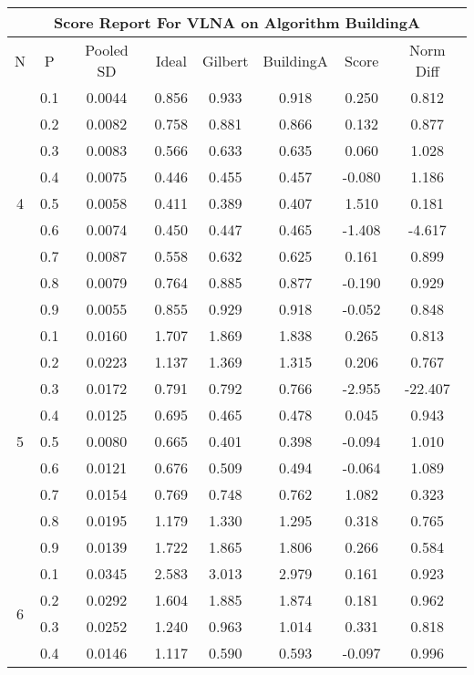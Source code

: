 \documentclass[11pt,a4paper]{report}
\begin{document}
\begin{longtable}{ | c | c || c | c | c | c | c | c | }
\hline
\multicolumn{8}{|c|}{ Score Report For VLNA on Algorithm BuildingA} \\
\hline
N & P & Pooled SD &  Ideal &  Gilbert & BuildingA  & Score & Norm Diff \\
 \hline
 \hline
 \endhead
\multirow{9}{*}{4} & 0.1 & 0.0044 & 0.856 & 0.933 & 0.918 & 0.250 & 0.812 \\
 & 0.2 & 0.0082 & 0.758 & 0.881 & 0.866 & 0.132 & 0.877 \\
 & 0.3 & 0.0083 & 0.566 & 0.633 & 0.635 & 0.060 & 1.028 \\
 & 0.4 & 0.0075 & 0.446 & 0.455 & 0.457 & -0.080 & 1.186 \\
 & 0.5 & 0.0058 & 0.411 & 0.389 & 0.407 & 1.510 & 0.181 \\
 & 0.6 & 0.0074 & 0.450 & 0.447 & 0.465 & -1.408 & -4.617 \\
 & 0.7 & 0.0087 & 0.558 & 0.632 & 0.625 & 0.161 & 0.899 \\
 & 0.8 & 0.0079 & 0.764 & 0.885 & 0.877 & -0.190 & 0.929 \\
 & 0.9 & 0.0055 & 0.855 & 0.929 & 0.918 & -0.052 & 0.848 \\
 \hline
\multirow{9}{*}{5} & 0.1 & 0.0160 & 1.707 & 1.869 & 1.838 & 0.265 & 0.813 \\
 & 0.2 & 0.0223 & 1.137 & 1.369 & 1.315 & 0.206 & 0.767 \\
 & 0.3 & 0.0172 & 0.791 & 0.792 & 0.766 & -2.955 & -22.407 \\
 & 0.4 & 0.0125 & 0.695 & 0.465 & 0.478 & 0.045 & 0.943 \\
 & 0.5 & 0.0080 & 0.665 & 0.401 & 0.398 & -0.094 & 1.010 \\
 & 0.6 & 0.0121 & 0.676 & 0.509 & 0.494 & -0.064 & 1.089 \\
 & 0.7 & 0.0154 & 0.769 & 0.748 & 0.762 & 1.082 & 0.323 \\
 & 0.8 & 0.0195 & 1.179 & 1.330 & 1.295 & 0.318 & 0.765 \\
 & 0.9 & 0.0139 & 1.722 & 1.865 & 1.806 & 0.266 & 0.584 \\
 \hline
\multirow{9}{*}{6} & 0.1 & 0.0345 & 2.583 & 3.013 & 2.979 & 0.161 & 0.923 \\
 & 0.2 & 0.0292 & 1.604 & 1.885 & 1.874 & 0.181 & 0.962 \\
 & 0.3 & 0.0252 & 1.240 & 0.963 & 1.014 & 0.331 & 0.818 \\
 & 0.4 & 0.0146 & 1.117 & 0.590 & 0.593 & -0.097 & 0.996 \\

\end{longtable}
\end{document}
